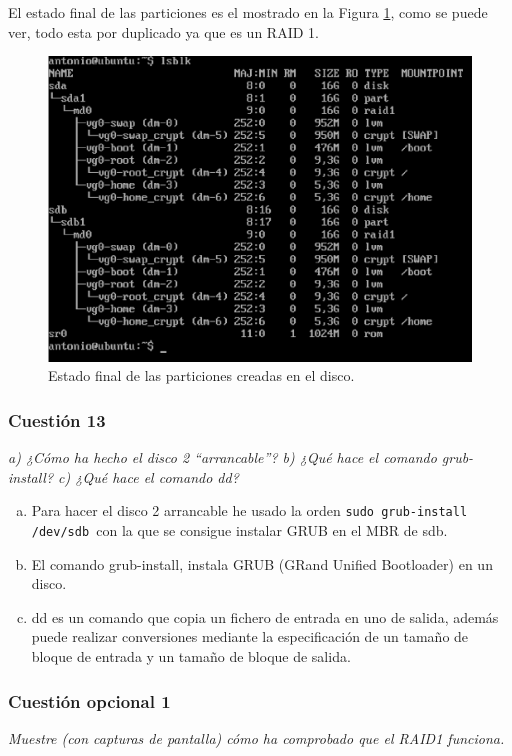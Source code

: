 El estado final de las particiones es el mostrado en la Figura \ref{fig3}, como se puede ver, todo esta por duplicado ya que es un RAID 1.
\begin{figure}[H]
    \begin{center}
        \includegraphics[scale=0.5]{Imagenes/particionado.eps}
        \caption{Estado final de las particiones creadas en el disco.}
        \label{fig3}
    \end{center}
\end{figure}
\subsubsection{Cuestión 13}

\textit{a) ¿Cómo ha hecho el disco 2 “arrancable”? b) ¿Qué hace el comando grub-install? c) ¿Qué hace el comando dd?} \newline
\begin{enumerate}[a)]
    \item Para hacer el disco 2 arrancable he usado la orden \texttt{sudo grub-install /dev/sdb }con la que se consigue instalar GRUB en el MBR de sdb.
    \item El comando grub-install, instala GRUB (GRand Unified Bootloader) en un disco. \cite{grub}
    \item dd es un comando que copia un fichero de entrada en uno de salida, además puede realizar conversiones mediante la especificación de un tamaño de bloque de entrada y un tamaño de bloque de salida. \cite{dd}
\end{enumerate}

\subsubsection{Cuestión opcional 1}
\textit{Muestre (con capturas de pantalla) cómo ha comprobado que el RAID1 funciona.} \newline

